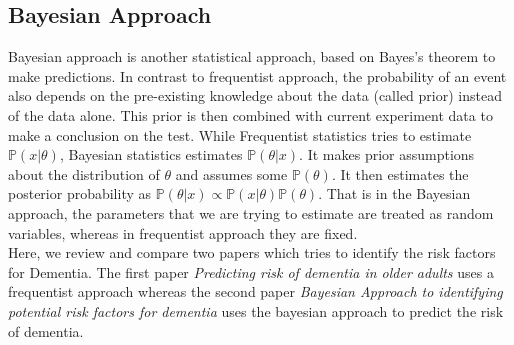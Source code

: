 \documentclass[12pt,letterpaper]{article}
\begin{document}

\subsection{Bayesian Approach}
Bayesian approach \cite{Croat,abc} is another statistical approach, based on Bayes's theorem to make predictions. In contrast to frequentist approach, the probability of an event also depends on the pre-existing knowledge about the data (called prior) instead of the data alone. This prior is then combined with current experiment data to make a conclusion on the test. While Frequentist statistics tries to estimate $\mathbb{P}( x | \theta)$, Bayesian statistics estimates $\mathbb{P}( \theta | x)$. It makes prior assumptions about the distribution of $\theta$ and assumes some $\mathbb{P}(\theta)$. It then estimates the posterior probability as $ \mathbb{P}( \theta | x) \propto \mathbb{P}( x | \theta) \mathbb{P}(\theta)$. That is in the Bayesian approach, the parameters that we are trying to estimate are treated as random variables, whereas in frequentist approach they are fixed.\\

Here, we review and compare two papers which tries to identify the risk factors for Dementia. The first paper \textit{Predicting risk of dementia in older adults} \cite{barnes2009} uses a frequentist approach whereas the second paper \textit{Bayesian Approach to identifying potential risk factors for dementia} \cite{Wen} uses the bayesian approach to predict the risk of dementia.


\end{document}
